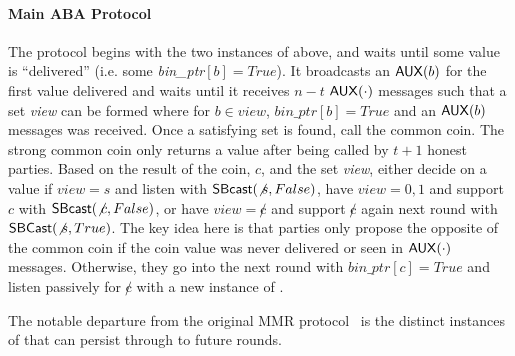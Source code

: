 \paragraph{Main ABA Protocol}
The protocol begins with the two instances of  above, and waits until some value is ``delivered'' (i.e. some \emph{bin\_ptr}$[b] = True$).
It broadcasts an ${\mathsf {AUX}}(b)$ for the first value delivered and waits until it receives $n-t$ ${\mathsf {AUX}}(\cdot)$ messages such that a set \emph{view} can be formed where for $b \in view$, $bin\_ptr[b] = True$ and an ${\mathsf {AUX}}(b)$ messages was received.
Once a satisfying set is found, call the common coin.
The strong common coin only returns a value after being called by $t+1$ honest parties.
Based on the result of the coin, $c$, and the set \emph{view}, either decide on a value if $view = {s}$ and listen with ${\mathsf {SBcast}}(\not s, False)$, have $view = {0,1}$ and support $c$ with ${\mathsf {SBcast}}(\not c, False)$, or have $view = {\not c}$ and support $\not c$ again next round with ${\mathsf {SBCast}}(\not s, True)$.
The key idea here is that parties only propose the opposite of the common coin if the coin value was never delivered or seen in ${\mathsf {AUX}}(\cdot)$ messages.
Otherwise, they go into the next round with $bin\_ptr[c] = True$ and listen passively for $\not c$ with a new instance of .

The notable departure from the original MMR protocol~\cite{oldmmr} is the distinct instances of  that can persist through to future rounds.
 
